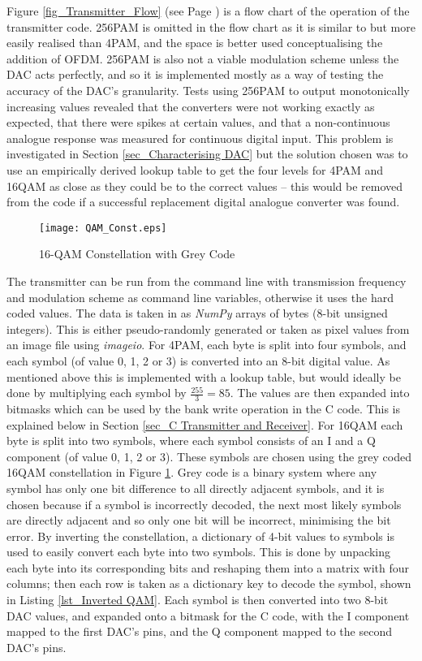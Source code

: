\documentclass[../main.tex]{subfiles}
\begin{document}
Figure \ref{fig_Transmitter_Flow} (see Page \pageref{fig_Transmitter_Flow}) is a flow chart of the operation of the transmitter code.
256PAM is omitted in the flow chart as it is similar to but more easily realised than 4PAM, and the space is better used conceptualising the addition of OFDM.
256PAM is also not a viable modulation scheme unless the DAC acts perfectly, and so it is implemented mostly as a way of testing the accuracy of the DAC's granularity.
Tests using 256PAM to output monotonically increasing values revealed that the converters were not working exactly as expected, that there were spikes at certain values, and that a non-continuous analogue response was measured for continuous digital input.
This problem is investigated in Section \ref{sec_Characterising DAC} but the solution chosen was to use an empirically derived lookup table to get the four levels for 4PAM and 16QAM as close as they could be to the correct values -- this would be removed from the code if a successful replacement digital analogue converter was found.\\

\begin{figure}[ht]
 	\centering
 	\texttt{[image: QAM\_Const.eps]}
 	\caption{16-QAM Constellation with Grey Code}
 	\label{fig_QAM Constellation}
\end{figure}

The transmitter can be run from the command line with transmission frequency and modulation scheme as command line variables, otherwise it uses the hard coded values.
The data is taken in as \textit{NumPy} arrays of bytes (8-bit unsigned integers).
This is either pseudo-randomly generated or taken as pixel values from an image file using \textit{imageio}.
For 4PAM, each byte is split into four symbols, and each symbol (of value 0, 1, 2 or 3) is converted into an 8-bit digital value.
As mentioned above this is implemented with a lookup table, but would ideally be done by multiplying each symbol by $\frac{255}{3} = 85$.
The values are then expanded into bitmasks which can be used by the bank write operation in the C code.
This is explained below in Section \ref{sec_C Transmitter and Receiver}.
For 16QAM each byte is split into two symbols, where each symbol consists of an I and a Q component (of value 0, 1, 2 or 3).
These symbols are chosen using the grey coded 16QAM constellation in Figure \ref{fig_QAM Constellation}.
Grey code is a binary system where any symbol has only one bit difference to all directly adjacent symbols, and it is chosen because if a symbol is incorrectly decoded, the next most likely symbols are directly adjacent and so only one bit will be incorrect, minimising the bit error.
By inverting the constellation, a dictionary of 4-bit values to symbols is used to easily convert each byte into two symbols.
This is done by unpacking each byte into its corresponding bits and reshaping them into a matrix with four columns; then each row is taken as a dictionary key to decode the symbol, shown in Listing \ref{lst_Inverted QAM}.
Each symbol is then converted into two 8-bit DAC values, and expanded onto a bitmask for the C code, with the I component mapped to the first DAC's pins, and the Q component mapped to the second DAC's pins.\\
\end{document}
